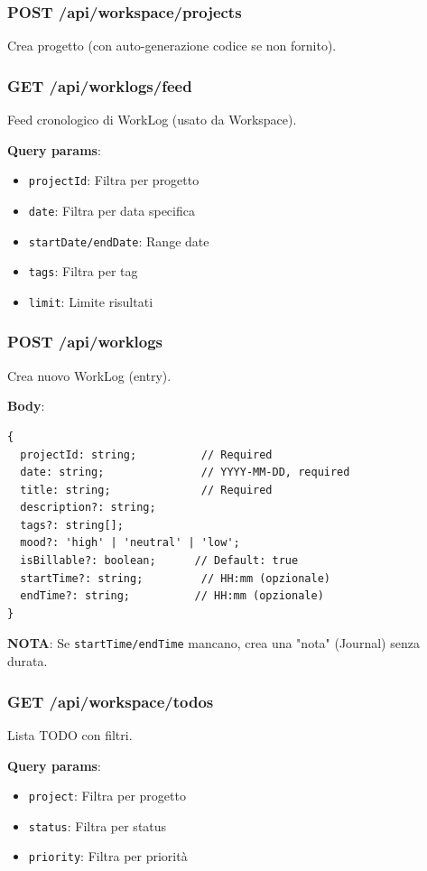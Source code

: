 \documentclass[11pt,a4paper]{article}
\begin{document}
\subsubsection{POST /api/workspace/projects}

Crea progetto (con auto-generazione codice se non fornito).

\subsubsection{GET /api/worklogs/feed}

Feed cronologico di WorkLog (usato da Workspace).

\textbf{Query params}:
\begin{itemize}
    \item \texttt{projectId}: Filtra per progetto
    \item \texttt{date}: Filtra per data specifica
    \item \texttt{startDate/endDate}: Range date
    \item \texttt{tags}: Filtra per tag
    \item \texttt{limit}: Limite risultati
\end{itemize}

\subsubsection{POST /api/worklogs}

Crea nuovo WorkLog (entry).

\textbf{Body}:
\begin{lstlisting}
{
  projectId: string;          // Required
  date: string;               // YYYY-MM-DD, required
  title: string;              // Required
  description?: string;
  tags?: string[];
  mood?: 'high' | 'neutral' | 'low';
  isBillable?: boolean;      // Default: true
  startTime?: string;         // HH:mm (opzionale)
  endTime?: string;          // HH:mm (opzionale)
}
\end{lstlisting}

\textbf{NOTA}: Se \texttt{startTime/endTime} mancano, crea una "nota" (Journal) senza durata.

\subsubsection{GET /api/workspace/todos}

Lista TODO con filtri.

\textbf{Query params}:
\begin{itemize}
    \item \texttt{project}: Filtra per progetto
    \item \texttt{status}: Filtra per status
    \item \texttt{priority}: Filtra per priorità
\end{itemize}
\end{document}
